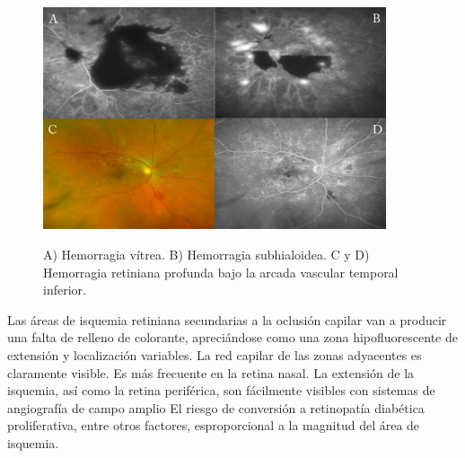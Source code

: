 \begin{figure}[H]
\centering
\includegraphics[width=0.9\textwidth]{./Figures/AF_HEMORRAGIA.png}
\label{fig:lightfilter}
\caption{ A) Hemorragia vítrea. B) Hemorragia subhialoidea. C y D) Hemorragia retiniana profunda bajo la arcada vascular temporal inferior.}
\end{figure}

Las áreas de isquemia retiniana secundarias a la oclusión capilar van a producir una falta de relleno de colorante, apreciándose como una zona hipofluorescente de extensión y localización variables. La red capilar de las zonas adyacentes es claramente visible. Es más frecuente en la retina nasal. 
La extensión de la isquemia, así como la retina periférica, son fácilmente visibles con sistemas de angiografía de campo amplio  El riesgo de conversión a retinopatía diabética proliferativa, entre otros factores, esproporcional a la magnitud del área de isquemia.
 
 
 

